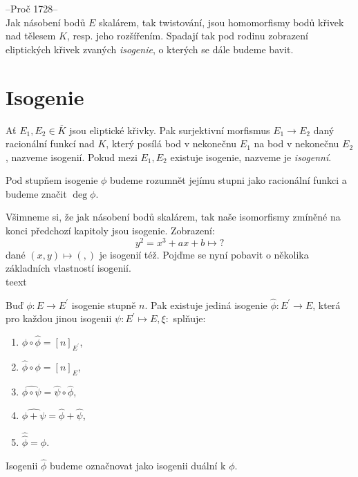 \documentclass [12pt]{report}
\begin{document}
--Proč 1728--\\

Jak násobení bodů $E$ skalárem, tak twistování, jsou homomorfismy bodů křivek nad tělesem $K$, resp. jeho rozšířením. Spadají tak pod rodinu zobrazení eliptických křivek zvaných \textit{isogenie}, o kterých se dále budeme bavit.

\section{Isogenie}



\begin{definice}
Ať $E_1,E_2 \in \overline{K}$ jsou eliptické křivky. Pak surjektivní morfismus $E_1 \longrightarrow E_2$  daný racionální funkcí nad $K$,  který posílá bod v nekonečnu $E_1$ na bod v nekonečnu $E_2$, nazveme isogenií. Pokud mezi $E_1,E_2$ existuje isogenie, nazveme je \textit{isogenní}.
\end{definice}
\begin{definice}
Pod stupňem isogenie $\phi$ budeme rozumnět jejímu stupni jako racionální funkci a budeme značit $\deg \phi$.
\end{definice}

Všimneme si, že jak násobení bodů skalárem, tak naše isomorfismy zmíněné na konci předchozí kapitoly jsou isogenie. Zobrazení:
\begin{equation*}
y^2 = x^3+ax+b \mapsto ?
\end{equation*}
dané $(x,y) \mapsto (,)$ je isogenií též. Pojďme se nyní pobavit o několika základních vlastností isogenií.\\



teext

\begin{veta}
Buď $\phi: E \longrightarrow E^\prime$ isogenie stupně $n$. Pak existuje jediná isogenie $\hat{\phi}: E^\prime \longrightarrow E$, která pro každou jinou isogenii $\psi: E^\prime \mapsto E, \xi : $ splňuje:
\begin{enumerate}
\item $\phi \circ \hat{\phi} = [n]_{E^\prime}$,
\item $\hat{\phi} \circ \phi = [n]_E$,
\item $\widehat{\phi \circ \psi} = \hat{\psi} \circ \hat{\phi}$,
\item $\widehat{\phi + \psi} = \hat{\phi} + \hat{\psi}$,
\item $\hat{\hat{\phi} } = \phi $.
\end{enumerate} 
Isogenii $\hat{\phi}$ budeme označnovat jako isogenii duální k $\phi$.
\end{veta}
\end{document}
